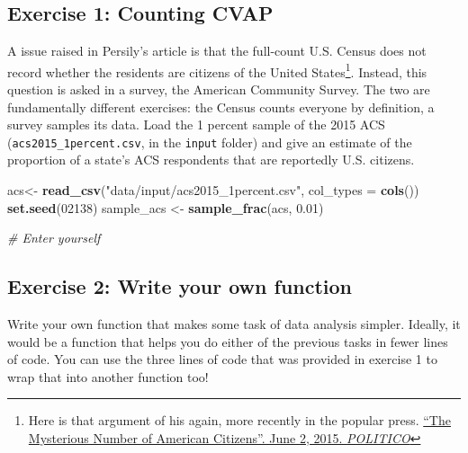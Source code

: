 \documentclass[]{book}
\newenvironment{Shaded}{\begin{snugshade}}{\end{snugshade}}
\newcommand{\CommentTok}[1]{\textcolor[rgb]{0.56,0.35,0.01}{\textit{#1}}}
\newcommand{\DataTypeTok}[1]{\textcolor[rgb]{0.13,0.29,0.53}{#1}}
\newcommand{\DecValTok}[1]{\textcolor[rgb]{0.00,0.00,0.81}{#1}}
\newcommand{\FloatTok}[1]{\textcolor[rgb]{0.00,0.00,0.81}{#1}}
\newcommand{\KeywordTok}[1]{\textcolor[rgb]{0.13,0.29,0.53}{\textbf{#1}}}
\newcommand{\NormalTok}[1]{#1}
\newcommand{\StringTok}[1]{\textcolor[rgb]{0.31,0.60,0.02}{#1}}
\let\rmarkdownfootnote\footnote%
\def\footnote{\protect\rmarkdownfootnote}
\theoremstyle{definition}
\theoremstyle{definition}
\theoremstyle{definition}
\theoremstyle{remark}
\begin{document}
\hypertarget{exercise-1-counting-cvap}{%
\subsection*{Exercise 1: Counting CVAP}\label{exercise-1-counting-cvap}}

A issue raised in Persily's article is that the full-count U.S. Census does not record whether the residents are citizens of the United States\footnote{Here is that argument of his again, more recently in the popular press. \href{http://www.politico.com/magazine/story/2015/06/the-supreme-courts-big-data-problem-118568}{``The Mysterious Number of American Citizens''. June 2, 2015. \emph{POLITICO}}}. Instead, this question is asked in a survey, the American Community Survey. The two are fundamentally different exercises: the Census counts everyone by definition, a survey samples its data. Load the 1 percent sample of the 2015 ACS (\texttt{acs2015\_1percent.csv}, in the \texttt{input} folder) and give an estimate of the proportion of a state's ACS respondents that are reportedly U.S. citizens.

\begin{Shaded}
\begin{Highlighting}[]
\NormalTok{acs<-}\StringTok{ }\KeywordTok{read_csv}\NormalTok{(}\StringTok{"data/input/acs2015_1percent.csv"}\NormalTok{, }\DataTypeTok{col_types =} \KeywordTok{cols}\NormalTok{())}
\KeywordTok{set.seed}\NormalTok{(}\DecValTok{02138}\NormalTok{)}
\NormalTok{sample_acs <-}\StringTok{ }\KeywordTok{sample_frac}\NormalTok{(acs, }\FloatTok{0.01}\NormalTok{)}

\CommentTok{# Enter yourself}
\end{Highlighting}
\end{Shaded}

\hypertarget{exercise-2-write-your-own-function}{%
\subsection*{Exercise 2: Write your own function}\label{exercise-2-write-your-own-function}}

Write your own function that makes some task of data analysis simpler. Ideally, it would be a function that helps you do either of the previous tasks in fewer lines of code. You can use the three lines of code that was provided in exercise 1 to wrap that into another function too!
\end{document}
